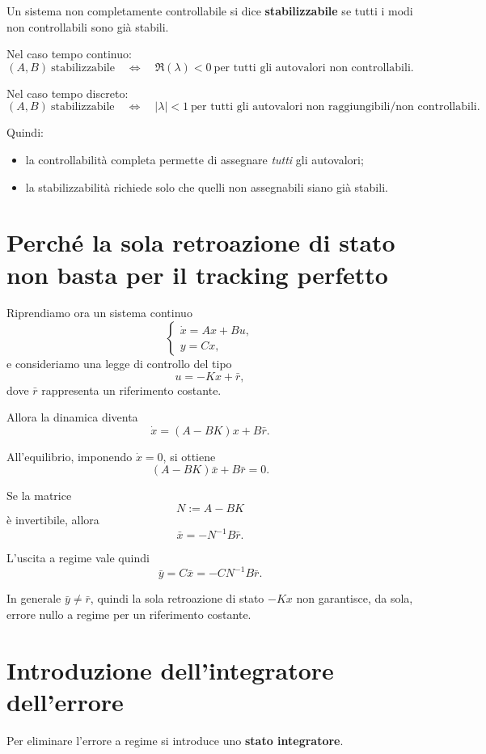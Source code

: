 Un sistema non completamente controllabile si dice \textbf{stabilizzabile} se tutti i modi non controllabili sono già stabili.

Nel caso tempo continuo:
\[
(A,B)\ \text{stabilizzabile}
\quad\Longleftrightarrow\quad
\Re(\lambda)<0\ \text{per tutti gli autovalori non controllabili}.
\]

Nel caso tempo discreto:
\[
(A,B)\ \text{stabilizzabile}
\quad\Longleftrightarrow\quad
|\lambda|<1\ \text{per tutti gli autovalori non raggiungibili/non controllabili}.
\]

Quindi:
\begin{itemize}
    \item la controllabilità completa permette di assegnare \emph{tutti} gli autovalori;
    \item la stabilizzabilità richiede solo che quelli non assegnabili siano già stabili.
\end{itemize}

\section{Perché la sola retroazione di stato non basta per il tracking perfetto}

Riprendiamo ora un sistema continuo
\[
\begin{cases}
\dot x=Ax+Bu,\\
y=Cx,
\end{cases}
\]
e consideriamo una legge di controllo del tipo
\[
u=-Kx+\bar r,
\]
dove \(\bar r\) rappresenta un riferimento costante.

Allora la dinamica diventa
\[
\dot x=(A-BK)x+B\bar r.
\]

All'equilibrio, imponendo \(\dot x=0\), si ottiene
\[
(A-BK)\bar x+B\bar r=0.
\]

Se la matrice
\[
N:=A-BK
\]
è invertibile, allora
\[
\bar x=-N^{-1}B\bar r.
\]

L'uscita a regime vale quindi
\[
\bar y=C\bar x=-CN^{-1}B\bar r.
\]

In generale \(\bar y\neq \bar r\), quindi la sola retroazione di stato \(-Kx\) non garantisce,
da sola, errore nullo a regime per un riferimento costante.

\section{Introduzione dell'integratore dell'errore}

Per eliminare l'errore a regime si introduce uno \textbf{stato integratore}.

